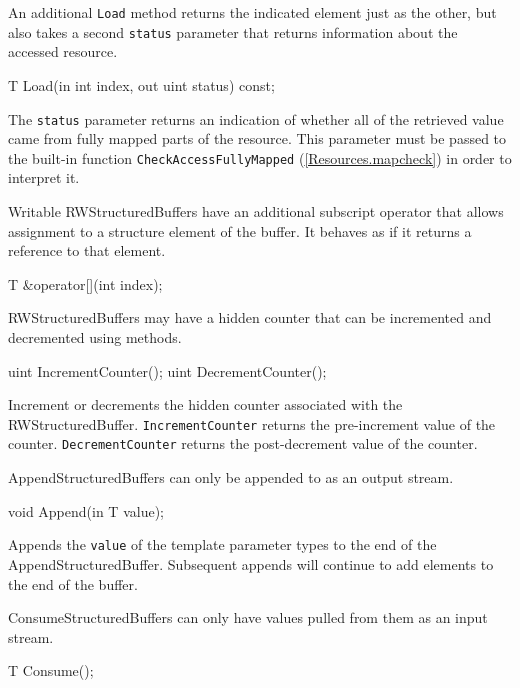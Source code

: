 An additional \texttt{Load} method returns the indicated element just as the other,
but also takes a second \texttt{status} parameter that returns information about the accessed resource.
\begin{HLSL}
 T Load(in int index, out uint status) const;
\end{HLSL}

The \texttt{status} parameter returns an indication of whether all of the retrieved value
came from fully mapped parts of the resource.
This parameter must be passed to the built-in function \texttt{CheckAccessFullyMapped} (\ref{Resources.mapcheck})
in order to interpret it.

Writable RWStructuredBuffers have an additional subscript operator that allows assignment to a structure element of the buffer.
It behaves as if it returns a reference to that element.
\begin{HLSL}
 T &operator[](int index);
\end{HLSL}


RWStructuredBuffers may have a hidden counter that can be incremented and decremented using methods.

\begin{HLSL}
   uint IncrementCounter();
   uint DecrementCounter();
\end{HLSL}

Increment or decrements the hidden counter associated with the RWStructuredBuffer.
\texttt{IncrementCounter} returns the pre-increment value of the counter.
\texttt{DecrementCounter} returns the post-decrement value of the counter.


AppendStructuredBuffers can only be appended to as an output stream.

\begin{HLSL}
   void Append(in T value);
\end{HLSL}

Appends the \texttt{value} of the template parameter types to the end of the AppendStructuredBuffer.
Subsequent appends will continue to add elements to the end of the buffer.


ConsumeStructuredBuffers can only have values pulled from them as an input stream.

\begin{HLSL}
   T Consume();
\end{HLSL}


